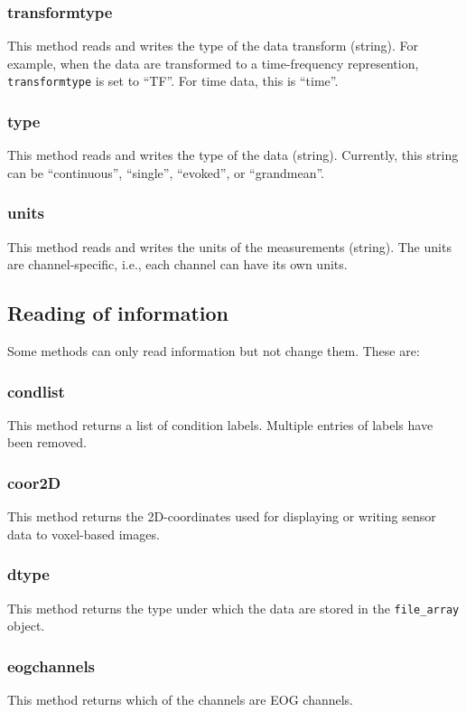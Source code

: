 \subsubsection{transformtype}
This method reads and writes the type of the data transform (string). For example, when the data are transformed to a time-frequency represention, \texttt{transformtype} is set to ``TF''. For time data, this is ``time''.

\subsubsection{type}
This method reads and writes the type of the data (string). Currently, this string can be ``continuous'', ``single'', ``evoked'', or ``grandmean''.

\subsubsection{units}
This method reads and writes the units of the measurements (string). The units are channel-specific, i.e., each channel can have its own units.


\subsection{Reading of information}
Some methods can only read information but not change them. These are:

\subsubsection{condlist}
This method returns a list of condition labels. Multiple entries of labels have been removed.

\subsubsection{coor2D}
This method returns the 2D-coordinates used for displaying or writing sensor data to voxel-based images.

\subsubsection{dtype}
This method returns the type under which the data are stored in the \texttt{file\_array} object.

\subsubsection{eogchannels}
This method returns which of the channels are EOG channels.

